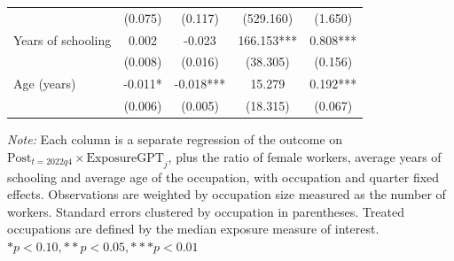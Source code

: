 \begin{table}[H]
{\begin{threeparttable}
\begin{tabular}[t]{lcccc}
        \hspace{1em}                   & (0.075)               & (0.117)                        & (529.160)              & (1.650)                     \\
        \hspace{1em}Years of schooling & 0.002                 & -0.023                         & 166.153***             & 0.808***                    \\
        \hspace{1em}                   & (0.008)               & (0.016)                        & (38.305)               & (0.156)                     \\
        \hspace{1em}Age (years)        & -0.011*               & -0.018***                      & 15.279                 & 0.192***                    \\
        \hspace{1em}                   & (0.006)               & (0.005)                        & (18.315)               & (0.067)                     \\
        \bottomrule
      \end{tabular}
      \begin{tablenotes}
        \item \textit{Note:} Each column is a separate regression of the outcome on $\text{Post}_{t=2022q4} \times \text{ExposureGPT}_j$, plus the ratio of female workers, average years of schooling and average age of the occupation, with occupation and quarter fixed effects. Observations are weighted by occupation size measured as the number of workers. Standard errors clustered by occupation in parentheses. Treated occupations are defined by the median exposure measure of interest. $* p<0.10, ** p<0.05, *** p<0.01$
      \end{tablenotes}
    \end{threeparttable}}
\end{table}




